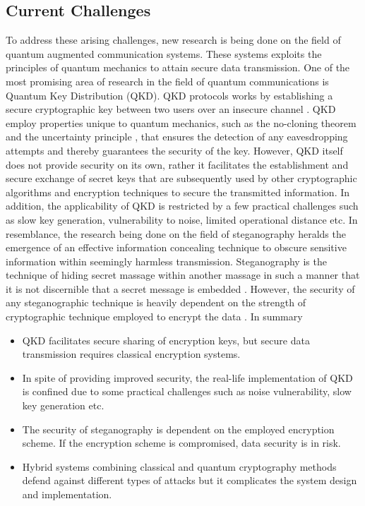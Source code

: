 \documentclass[a4paper]{cas-sc}
\begin{document}
\subsection{Current Challenges}
To address these arising challenges, new research is being done on the field of quantum augmented communication systems. These systems exploits the principles of quantum mechanics to attain secure data transmission. One of the most promising area of research in the field of quantum communications is Quantum Key Distribution (QKD). QKD protocols works by establishing a secure cryptographic key between two users over an insecure channel \cite{alleaume2014using}. QKD employ properties unique to quantum mechanics, such as the no-cloning theorem \cite{buvzek1996quantum} and the uncertainty principle \cite{sen2014uncertainty}, that ensures the detection of any eavesdropping attempts and thereby guarantees the security of the key. However, QKD itself does not provide security on its own, rather it facilitates the establishment and secure exchange of secret keys that are subsequently used by other cryptographic algorithms and encryption techniques to secure the transmitted information. In addition, the applicability of QKD is restricted by a few practical challenges such as slow key generation, vulnerability to noise, limited operational distance etc. In resemblance, the research being done on the field of steganography heralds the emergence of an effective information concealing technique to obscure sensitive information within seemingly harmless transmission. Steganography is the technique of hiding secret massage within another massage in such a manner that it is not discernible that a secret message is embedded \cite{Kahn1996}. However, the security of any steganographic technique is heavily dependent on the strength of cryptographic technique employed to encrypt the data \cite{anderson1998limits}. In summary
\begin{itemize}
    \item QKD facilitates secure sharing of encryption keys, but secure data transmission requires classical encryption systems.
    \item In spite of providing improved security, the real-life implementation of QKD is confined due to some practical challenges such as noise vulnerability, slow key generation etc.
    \item The security of steganography is dependent on the employed encryption scheme. If the encryption scheme is compromised, data security is in risk.
    \item Hybrid systems combining classical and quantum cryptography methods defend against different types of attacks but it complicates the system design and implementation.
\end{itemize}
\end{document}
